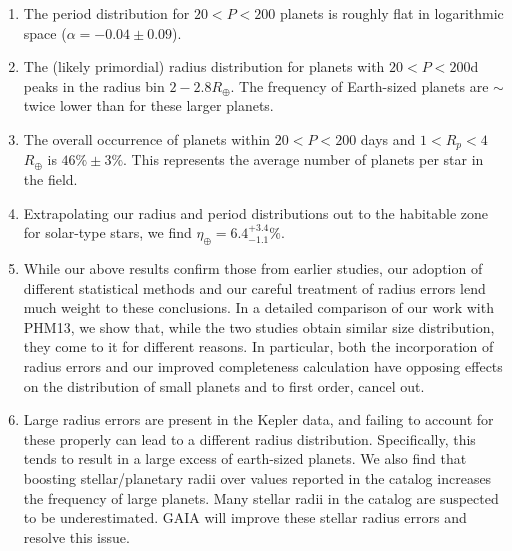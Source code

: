 \begin{enumerate}

\item The period distribution for $20<P<200$ planets is roughly flat
  in logarithmic space ($\alpha=-0.04 \pm 0.09$).

\item The (likely primordial) radius distribution for \kep{} planets
  with $20<P<200$d peaks in the radius bin $2-2.8 R_\oplus$. The
  frequency of Earth-sized planets are $\sim$ twice lower than for
  these larger planets.
  
\item The overall occurrence of planets within $20<P<200$ days and
  $1<R_p<4$$R_\oplus$ is $46\% \pm 3\%$. This represents the average
  number of planets per star in the \kep{} field.

\item Extrapolating our radius and period distributions out to the
  habitable
  zone for solar-type stars, we find $\eta_{\oplus}=6.4^{+3.4}_{-1.1}\%$.\\

\item While our above results confirm those from earlier studies, our
  adoption of different statistical methods and our careful treatment
  of radius errors lend much weight to these conclusions.  In a
  detailed comparison of our work with PHM13, we show that, while the
  two studies obtain similar size distribution, they come to it for
  different reasons. In particular, both the incorporation of radius
  errors and our improved completeness calculation have
  opposing effects on the distribution of small planets and to first
  order, cancel out.

\item Large radius errors are present in the Kepler data, and failing
  to account for these properly can lead to a different radius
  distribution. Specifically, this tends to result in a large excess
  of earth-sized planets. We also find that boosting stellar/planetary
  radii over values reported in the \kep{} catalog increases the
  frequency of large planets. Many stellar radii in the \kep{}
  catalog are suspected to be underestimated. GAIA will improve
  these stellar radius errors and resolve this issue.

\end{enumerate}
